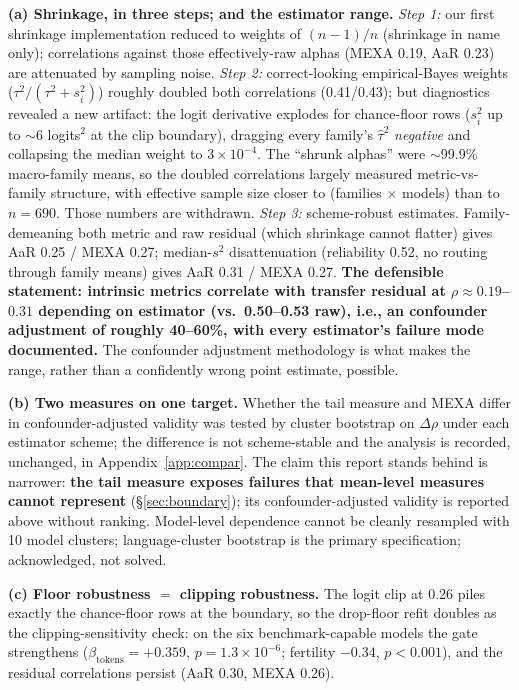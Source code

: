 \documentclass[11pt,a4paper]{article}
\begin{document}
\textbf{(a) Shrinkage, in three steps; and the estimator range.}
\emph{Step 1:} our first shrinkage implementation reduced to weights of
$(n{-}1)/n$ (shrinkage in name only); correlations against those
effectively-raw alphas (MEXA 0.19, AaR 0.23) are attenuated by sampling noise.
\emph{Step 2:} correct-looking empirical-Bayes weights
($\tau^2/(\tau^2+s_i^2)$) roughly doubled both correlations (0.41/0.43); but diagnostics revealed a new artifact: the logit derivative explodes for
chance-floor rows ($s_i^2$ up to $\sim$6 logits$^2$ at the clip boundary),
dragging every family's $\hat\tau^2$ \emph{negative} and collapsing the median
weight to $3\times10^{-4}$. The ``shrunk alphas'' were $\sim$99.9\%
macro-family means, so the doubled correlations largely measured
metric-vs-family structure, with effective sample size closer to
(families $\times$ models) than to $n{=}690$. Those numbers are withdrawn.
\emph{Step 3:} scheme-robust estimates. Family-demeaning both metric and raw
residual (which shrinkage cannot flatter) gives AaR 0.25 / MEXA 0.27;
median-$s^2$ disattenuation (reliability 0.52, no routing through family
means) gives AaR 0.31 / MEXA 0.27. \textbf{The defensible statement:
intrinsic metrics correlate with transfer residual at $\rho \approx 0.19$--$0.31$
depending on estimator (vs.\ 0.50--0.53 raw), i.e., an confounder adjustment of
roughly 40--60\%, with every estimator's failure mode documented.} The
confounder adjustment methodology is what makes the range, rather than a
confidently wrong point estimate, possible.

\textbf{(b) Two measures on one target.} Whether the tail measure and
MEXA differ in confounder-adjusted validity was tested by cluster bootstrap on
$\Delta\rho$ under each estimator scheme; the difference is not scheme-stable
and the analysis is recorded, unchanged, in Appendix~\ref{app:compar}. The
claim this report stands behind is narrower: \textbf{the tail measure
exposes failures that mean-level measures cannot represent}
(\S\ref{sec:boundary}); its confounder-adjusted validity is reported above without
ranking. Model-level dependence cannot be cleanly resampled with 10 model
clusters; language-cluster bootstrap is the primary specification;
acknowledged, not solved.

\textbf{(c) Floor robustness $=$ clipping robustness.} The logit clip at 0.26
piles exactly the chance-floor rows at the boundary, so the drop-floor refit
doubles as the clipping-sensitivity check: on the six benchmark-capable models the
gate strengthens ($\beta_{\mathrm{tokens}} = +0.359$, $p = 1.3\times10^{-6}$;
fertility $-0.34$, $p<0.001$), and the residual correlations persist
(AaR 0.30, MEXA 0.26).
\end{document}
